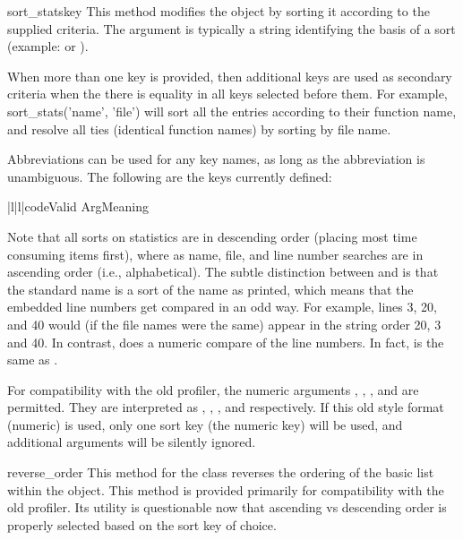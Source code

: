 \begin{funcdesc}{sort_stats}{key}
This method modifies the  object by sorting it according to the
supplied criteria.  The argument is typically a string identifying the
basis of a sort (example:  or ).

When more than one key is provided, then additional keys are used as
secondary criteria when the there is equality in all keys selected
before them.  For example, sort_stats('name', 'file') will sort all
the entries according to their function name, and resolve all ties
(identical function names) by sorting by file name.

Abbreviations can be used for any key names, as long as the
abbreviation is unambiguous.  The following are the keys currently
defined: 

\begin{tableii}{|l|l|}{code}{Valid Arg}{Meaning}
\end{tableii}

Note that all sorts on statistics are in descending order (placing
most time consuming items first), where as name, file, and line number
searches are in ascending order (i.e., alphabetical). The subtle
distinction between  and  is that the
standard name is a sort of the name as printed, which means that the
embedded line numbers get compared in an odd way.  For example, lines
3, 20, and 40 would (if the file names were the same) appear in the
string order 20, 3 and 40.  In contrast,  does a numeric
compare of the line numbers.  In fact,  is the
same as .

For compatibility with the old profiler, the numeric arguments
, , , and  are permitted.  They are
interpreted as , , , and
 respectively.  If this old style format (numeric)
is used, only one sort key (the numeric key) will be used, and
additional arguments will be silently ignored.
\end{funcdesc}


\begin{funcdesc}{reverse_order}{}
This method for the  class reverses the ordering of the basic
list within the object.  This method is provided primarily for
compatibility with the old profiler.  Its utility is questionable
now that ascending vs descending order is properly selected based on
the sort key of choice.
\end{funcdesc}

